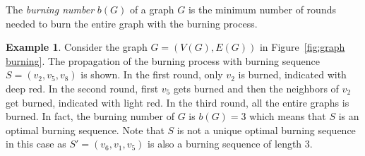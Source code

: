 \documentclass[12pt]{article}
\theoremstyle{plain}
\theoremstyle{definition}
\newtheorem{example}[theorem]{Example}
\theoremstyle{remark}
\begin{document}



The \textit{burning number} $b(G)$ of a graph $G$ is the minimum number of rounds needed to burn the entire graph with the burning process. 
 



\begin{example}
    Consider the graph $G=(V(G),E(G))$ in Figure~\ref{fig:graph burning}. The propagation of the burning process with burning sequence $S=(v_2,v_5,v_8)$ is shown. In the first round, only $v_2$ is burned, indicated with deep red. In the second round, first $v_5$ gets burned and then the neighbors of $v_2$ get burned, indicated with light red. In the third round, all the entire graphs is burned. In fact, the burning number of $G$ is $b(G)=3$ which means that $S$ is an optimal burning sequence. Note that $S$ is not a unique optimal burning sequence in this case as $S'=(v_6,v_1,v_5)$ is also a burning sequence of length 3.
    \begin{figure}[htp!]
        \centering
        \begin{subfigure}[t]{0.30\textwidth}
            


\begin{tikzpicture}[x=0.75pt,y=0.75pt,yscale=-1,xscale=1]


\end{tikzpicture}
\end{subfigure}
\end{figure}
\end{example}
\end{document}
